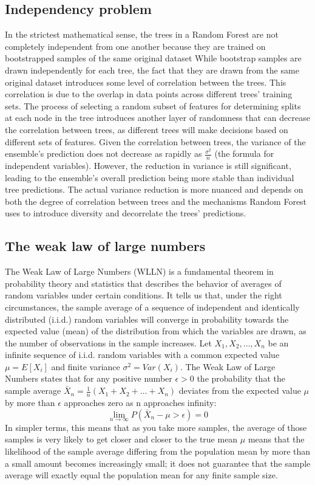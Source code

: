 \documentclass[12pt]{article}
\begin{document}
\subsection{Independency problem}
In the strictest mathematical sense, the trees in a Random Forest are not completely independent from one another because they are trained on bootstrapped samples of the same original dataset
While bootstrap samples are drawn independently for each tree, the fact that they are drawn from the same original dataset introduces some level of correlation between the trees. This correlation is due to the overlap in data points across different trees' training sets.
The process of selecting a random subset of features for determining splits at each node in the tree introduces another layer of randomness that can decrease the correlation between trees, as different trees will make decisions based on different sets of features. Given the correlation between trees, the variance of the ensemble's prediction does not decrease as rapidly as $\frac{\sigma^2}{n}$ (the formula for independent variables). However, the reduction in variance is still significant, leading to the ensemble's overall prediction being more stable than individual tree predictions. The actual variance reduction is more nuanced and depends on both the degree of correlation between trees and the mechanisms Random Forest uses to introduce diversity and decorrelate the trees' predictions.

\subsection{The weak law of large numbers}
The Weak Law of Large Numbers (WLLN) is a fundamental theorem in probability theory and statistics that describes the behavior of averages of random variables under certain conditions. It tells us that, under the right circumstances, the sample average of a sequence of independent and identically distributed (i.i.d.) random variables will converge in probability towards the expected value (mean) of the distribution from which the variables are drawn, as the number of observations in the sample increases.
Let $X_1,X_2,\ldots,X_n$ be an infinite sequence of i.i.d. random variables with a common expected value  $\mu =E[X_i]$ and finite variance $\sigma^2=Var(X_i)$. The Weak Law of Large Numbers states that for any positive number $\epsilon >0$  the probability that the sample average $\bar{X}_n = \frac{1}{n}(X_1+X_2+\ldots+X_n)$ deviates from the expected value $\mu$ by more than $\epsilon$ approaches zero as n approaches infinity:
$$\lim_{n \to \infty} P(\bar{X}_n-\mu>\epsilon) = 0$$In simpler terms, this means that as you take more samples, the average of those samples is very likely to get closer and closer to the true mean $\mu$ means that the likelihood of the sample average differing from the population mean by more than a small amount becomes increasingly small; it does not guarantee that the sample average will exactly equal the population mean for any finite sample size.
\end{document}
